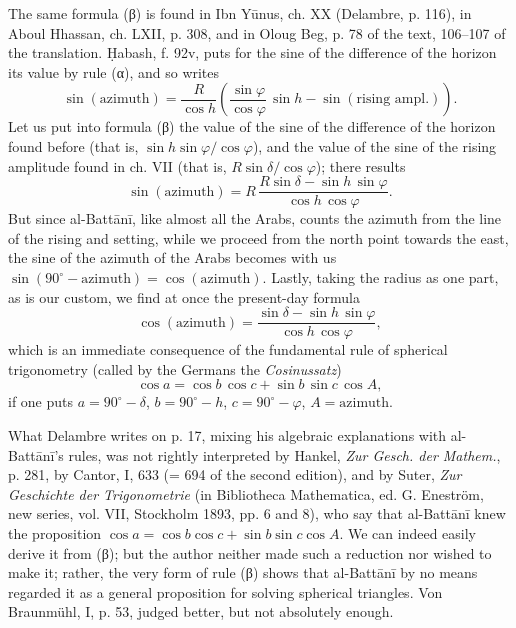 \documentclass[11pt]{article}
\newcommand{\Pg}[1]{\marginpar{\footnotesize\color{gray}#1}}
\begin{document}
\par The same formula ({\greekfont β}) is found in Ibn Yūnus, ch. XX (Delambre, p. 116), in Aboul Hhassan, ch. LXII, p. 308, and in Oloug Beg, p. 78 of the text, 106–107 of the translation. Ḥabash, f. 92v, puts for the sine of the difference of the horizon its value by rule ({\greekfont α}), and so writes \[ \sin(\text{azimuth}) = \frac{R}{\cos h}\left(\frac{\sin\varphi}{\cos\varphi}\,\sin h - \sin(\text{rising ampl.})\right). \] Let us put into formula ({\greekfont β}) the value of the sine of the difference of the horizon found before (that is, $\sin h \sin\varphi/\cos\varphi$), and the value of the sine of the rising amplitude found in ch. VII (that is, $R\sin\delta/\cos\varphi$); there results \[ \sin(\text{azimuth}) = R\,\frac{R\sin\delta - \sin h\,\sin\varphi}{\cos h\,\cos\varphi}. \] But since al-Battānī, like almost all the Arabs, counts the azimuth from the line of the rising and setting, while we proceed from the north point towards the east, the sine of the azimuth of the Arabs becomes with us $\sin(90^\circ - \text{azimuth}) = \cos(\text{azimuth})$. Lastly, taking the radius as one part, as is our custom, we find at once the present-day formula \[ \cos(\text{azimuth}) = \frac{\sin\delta - \sin h\,\sin\varphi}{\cos h\,\cos\varphi}, \] which is an immediate consequence of the fundamental rule of spherical trigonometry (called by the Germans the \emph{Cosinussatz}) \[ \cos a = \cos b\,\cos c + \sin b\,\sin c\,\cos A, \] if one puts $a = 90^\circ - \delta$, $b = 90^\circ - h$, $c = 90^\circ - \varphi$, $A = \text{azimuth}$.\par
\par \Pg{I 185}What Delambre writes on p. 17, mixing his algebraic explanations with al-Battānī's rules, was not rightly interpreted by Hankel, \emph{Zur Gesch. der Mathem.}, p. 281, by Cantor, I, 633 (= 694 of the second edition), and by Suter, \emph{Zur Geschichte der Trigonometrie} (in Bibliotheca Mathematica, ed. G. Eneström, new series, vol. VII, Stockholm 1893, pp. 6 and 8), who say that al-Battānī knew the proposition $\cos a = \cos b \cos c + \sin b \sin c \cos A$. We can indeed easily derive it from ({\greekfont β}); but the author neither made such a reduction nor wished to make it; rather, the very form of rule ({\greekfont β}) shows that al-Battānī by no means regarded it as a general proposition for solving spherical triangles. Von Braunmühl, I, p. 53, judged better, but not absolutely enough.\par
\end{document}
